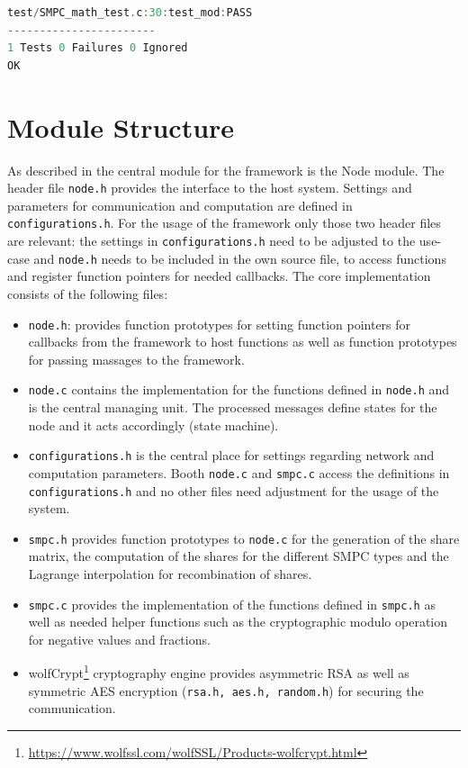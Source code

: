 \begin{lstlisting}[language=C, caption={Unity test result}, label={Unity test result}, float, floatplacement=H]
test/SMPC_math_test.c:30:test_mod:PASS
-----------------------
1 Tests 0 Failures 0 Ignored 
OK
\end{lstlisting}


\section{Module Structure} \label{Module Structure}

As described in  the central module for the framework is the Node module. The header file \lstinline|node.h| provides the interface to the host system. Settings and parameters for communication and computation are defined in \lstinline|configurations.h|. For the usage of the framework only those two header files are relevant: the settings in \lstinline|configurations.h| need to be adjusted to the use-case and  \lstinline|node.h| needs to be included in the own source file, to access functions and register function pointers for needed callbacks.
The core implementation consists of the following files:

\begin{itemize}
	\item \lstinline|node.h|: provides function prototypes for setting function pointers for callbacks from the framework to host functions as well as function prototypes for passing massages to the framework.
	\item \lstinline|node.c| contains the implementation for the functions defined in \lstinline|node.h| and is the central managing unit. The processed messages define states for the node and it acts accordingly (state machine).
	\item \lstinline|configurations.h| is the central place for settings regarding network and computation parameters. Booth \lstinline|node.c| and \lstinline|smpc.c| access the definitions in \lstinline|configurations.h| and no other files need adjustment for the usage of the system.
	\item \lstinline|smpc.h| provides function prototypes to \lstinline|node.c| for the generation of the share matrix, the computation of the shares for the different \gls{SMPC} types and the Lagrange interpolation for recombination of shares.
	\item \lstinline|smpc.c| provides the implementation of the functions defined in \lstinline|smpc.h| as well as needed helper functions such as the cryptographic modulo operation for negative values and fractions.
	\item wolfCrypt\footnote{\url{https://www.wolfssl.com/wolfSSL/Products-wolfcrypt.html}} cryptography engine provides asymmetric \gls{RSA} as well as symmetric \gls{AES} encryption (\lstinline|rsa.h, aes.h, random.h|) for securing the communication.
\end{itemize}

